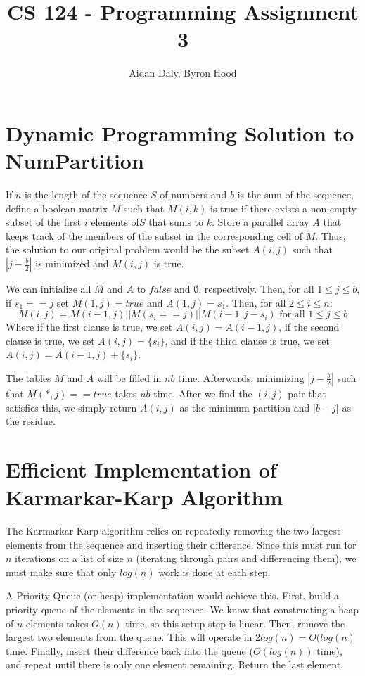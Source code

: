 \documentclass[11pt]{article}
\title{CS 124 - Programming Assignment 3}
\author{Aidan Daly, Byron Hood}
\begin{document}
\maketitle

\section{Dynamic Programming Solution to NumPartition}
If $n$ is the length of the sequence $S$ of numbers and $b$ is the sum of the sequence, define a boolean matrix $M$ such that $M(i,k)$ is true if there exists a non-empty subset of the first $i$ elements of$S$ that sums to $k$.  Store a parallel array $A$ that keeps track of the members of the subset in the corresponding cell of $M$.  Thus, the solution to our original problem would be the subset $A(i,j)$ such that $|j-\frac{b}{2}|$ is minimized and $M(i,j)$ is true.

We can initialize all $M$ and $A$ to $false$ and $\emptyset$, respectively.  Then, for all $1\leq j \leq b$, if $s_1 == j$ set $M(1,j) = true$ and $A(1,j) = s_1$.  Then, for all $2 \leq i \leq n$:
\begin{equation}
M(i,j) = M(i-1,j) || M(s_i == j) || M(i-1,j-s_i) \mbox{ for all } 1 \leq j \leq b
\end{equation}
Where if the first clause is true, we set $A(i,j) = A(i-1,j)$, if the second clause is true, we set $A(i,j) = \{s_i\}$, and if the third clause is true, we set $A(i,j) = A(i-1,j)+\{s_i\}$.

The tables $M$ and $A$ will be filled in $nb$ time.  Afterwards, minimizing $|j-\frac{b}{2}|$ such that $M(*,j) == true$ takes $nb$ time.  After we find the $(i,j)$ pair that satisfies this, we simply return $A(i,j)$ as the minimum partition and $|b-j|$ as the residue.

\section{Efficient Implementation of Karmarkar-Karp Algorithm}
The Karmarkar-Karp algorithm relies on repeatedly removing the two largest elements from the sequence and inserting their difference.  Since this must run for $n$ iterations on a list of size $n$ (iterating through pairs and differencing them), we must make sure that only $log(n)$ work is done at each step.

A Priority Queue (or heap) implementation would achieve this.  First, build a priority queue of the elements in the sequence.  We know that constructing a heap of $n$ elements takes $O(n)$ time, so this setup step is linear.  Then, remove the largest two elements from the queue.  This will operate in $2log(n) = O(log(n)$ time.  Finally, insert their difference back into the queue ($O(log(n))$ time), and repeat until there is only one element remaining.  Return the last element. 
\end{document}
